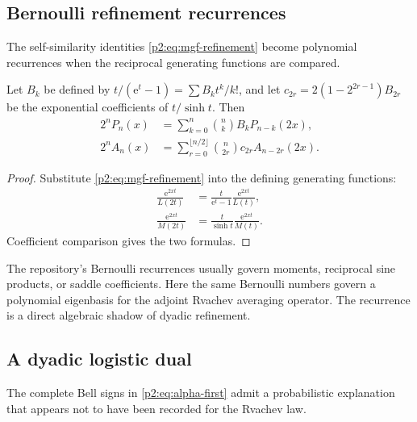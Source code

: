 \documentclass[11pt,oneside]{article}
\numberwithin{equation}{section}
\theoremstyle{definition}
\theoremstyle{remark}
\newcommand{\e}{\mathrm e}
\begin{document}
\subsection{Bernoulli refinement recurrences}

The self-similarity identities \eqref{p2:eq:mgf-refinement} become polynomial recurrences when the
reciprocal generating functions are compared.

\begin{proposition}
\label{p2:prop:Bernoulli-refinement}
Let $B_k$ be defined by $t/(\e^t-1)=\sum B_kt^k/k!$, and let
$c_{2r}=2(1-2^{2r-1})B_{2r}$ be the exponential coefficients of
$t/\sinh t$.  Then
\begin{align}
 2^nP_n(x)
 &=\sum_{k=0}^n\binom nkB_kP_{n-k}(2x),
 \label{p2:eq:P-Bernoulli-refinement}\\
 2^nA_n(x)
 &=\sum_{r=0}^{\lfloor n/2\rfloor}
   \binom n{2r}c_{2r}A_{n-2r}(2x).
 \label{p2:eq:A-Bernoulli-refinement}
\end{align}
\end{proposition}

\begin{proof}
Substitute \eqref{p2:eq:mgf-refinement} into the defining generating functions:
\begin{align*}
 \frac{\e^{2xt}}{L(2t)}
 &=\frac{t}{\e^t-1}\frac{\e^{2xt}}{L(t)},\\
 \frac{\e^{2xt}}{M(2t)}
 &=\frac{t}{\sinh t}\frac{\e^{2xt}}{M(t)}.
\end{align*}
Coefficient comparison gives the two formulas.
\end{proof}

\begin{remark}
The repository's Bernoulli recurrences usually govern moments, reciprocal sine products, or saddle
coefficients.  Here the same Bernoulli numbers govern a polynomial eigenbasis for the adjoint
Rvachev averaging operator.  The recurrence is a direct algebraic shadow of dyadic refinement.
\end{remark}

\subsection{A dyadic logistic dual}

The complete Bell signs in \eqref{p2:eq:alpha-first} admit a probabilistic explanation that appears not
to have been recorded for the Rvachev law.
\end{document}
